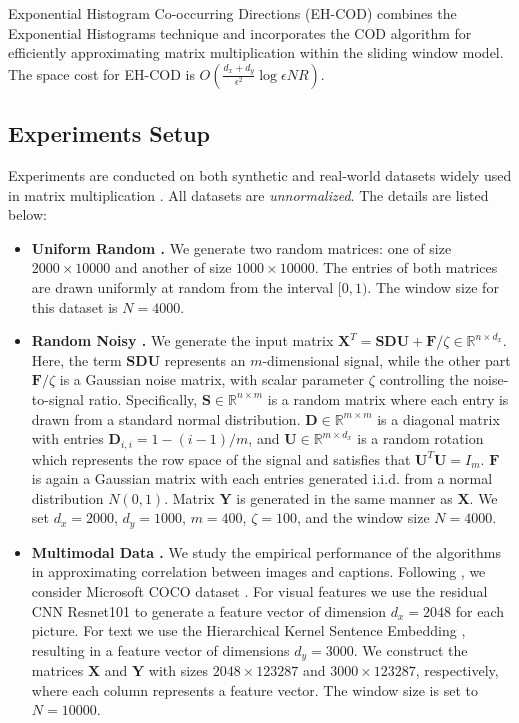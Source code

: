 Exponential Histogram Co-occurring Directions (EH-COD) combines the Exponential Histograms technique \cite{DatarGIM02} and incorporates the COD algorithm for efficiently approximating matrix multiplication within the sliding window model. The space cost for EH-COD is $O(\frac{d_x+d_y}{\epsilon^2}\log{\epsilon NR})$.



\subsection{Experiments Setup}
 Experiments are conducted on both synthetic and real-world datasets widely used in matrix multiplication \cite{YaoLCWC24,YeLZ16,MrouehMG17,GhashamiDP14,KangKK20}. All datasets are \emph{unnormalized}.
The details are listed below:
\begin{itemize}[leftmargin=10pt]
\item \textbf{Uniform Random \cite{YaoLCWC24,YeLZ16}.} We generate two random matrices: one of size $2000 \times 10000$ and another of size $1000 \times 10000$. The entries of both matrices are drawn uniformly at random from the interval $[0, 1)$. The window size for this dataset is $N = 4000$.
    
\item \textbf{Random Noisy \cite{MrouehMG17,GhashamiDP14}.} 
We generate the input matrix $\boldsymbol{X}^T = \boldsymbol{SDU} + \boldsymbol{F} / \zeta \in \mathbb{R}^{n \times d_x}$. Here, the term $\boldsymbol{SDU}$ represents an $m$-dimensional signal, while the other part $\boldsymbol{F} / \zeta$ is a Gaussian noise matrix, with scalar parameter $\zeta$ controlling the noise-to-signal ratio.
Specifically, $\boldsymbol{S}\in\mathbb{R}^{n\times m}$ is a random matrix where each entry is drawn from a standard normal distribution. $\boldsymbol{D}\in\mathbb{R}^{m\times m}$ is a diagonal matrix with entries $\boldsymbol{D}_{i,i}=1-(i-1)/m$, and $\boldsymbol{U}\in\mathbb{R}^{m\times d_x}$ is a random rotation which represents the row space of the signal and satisfies that $\boldsymbol{U}^T\boldsymbol{U}=I_m$. $\boldsymbol{F}$ is again a Gaussian matrix with each entries generated i.i.d. from a normal distribution $N(0,1)$. Matrix $\boldsymbol{Y}$ is generated in the same manner as $\boldsymbol{X}$. We set $d_x = 2000$, $d_y=1000$, $m = 400$, $\zeta = 100$, and the window size $N = 4000$.

 \item \textbf{Multimodal Data \cite{MrouehMG17}.} We study the empirical performance of the algorithms in approximating correlation between images and captions. Following \cite{MrouehMG17}, we consider Microsoft COCO dataset \cite{LinMBHPRDZ14}. For visual features we use the residual CNN Resnet101 \cite{HeZRS16} to generate a feature vector of dimension $d_x = 2048$ for each picture. For text we use the Hierarchical Kernel Sentence Embedding \cite{mroueh2015asymmetrically}, resulting in a feature vector of dimensions $d_y = 3000$. We construct the matrices $\boldsymbol{X}$ and $\boldsymbol{Y}$ with sizes $2048 \times 123287$ and $3000 \times 123287$, respectively, where each column represents a feature vector. The window size is set to $N = 10000$.


\end{itemize}
